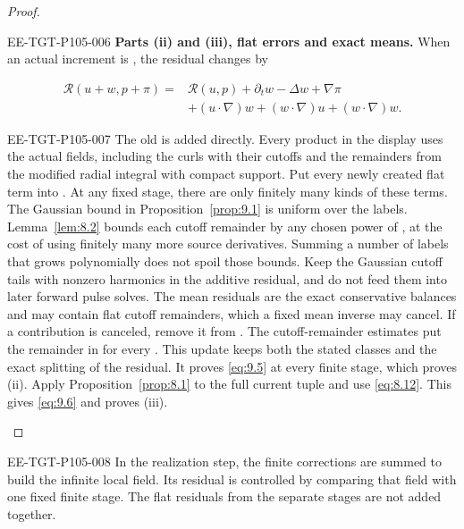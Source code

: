 \begin{proof}
\begin{EESegment}{EE-TGT-P105-006}
\noindent\textbf{Parts (ii) and (iii), flat errors and exact means.} When an actual increment is
, the residual changes by
\end{EESegment}
\[
\begin{aligned}
\mathscr R(u+w,p+\pi)={}&\mathscr R(u,p)+\partial_t w-\Delta w+\nabla\pi\\
&+(u\mathbin{\cdot}\nabla)w+(w\mathbin{\cdot}\nabla)u+(w\mathbin{\cdot}\nabla)w.
\end{aligned}
\]
\begin{EESegment}{EE-TGT-P105-007}
The old  is added directly. Every product in the display uses the
actual fields, including the curls with their cutoffs and the remainders from the modified radial
integral with compact support. Put every newly created flat term into
. At any fixed stage, there are only finitely many kinds of these
terms. The Gaussian bound in Proposition~\ref{prop:9.1} is uniform over the labels.
Lemma~\ref{lem:8.2} bounds each cutoff remainder by any chosen power of
, at the cost of using finitely many more source derivatives. Summing a
number of labels that grows polynomially does not spoil those bounds. Keep the Gaussian cutoff tails
with nonzero harmonics in the additive residual, and do not feed them into later forward pulse
solves. The mean residuals  are the exact conservative balances
and may contain flat cutoff remainders, which a fixed mean inverse may cancel. If a contribution
is canceled, remove it from . The cutoff-remainder estimates put the
remainder in  for every
. This update keeps both the stated classes and the exact splitting of
the residual. It proves \eqref{eq:9.5} at every finite stage, which proves (ii). Apply
Proposition~\ref{prop:8.1} to the full current tuple and use \eqref{eq:8.12}. This gives
\eqref{eq:9.6} and proves (iii).
\end{EESegment}
\end{proof}

\begin{EESegment}{EE-TGT-P105-008}
In the realization step, the finite corrections are summed to build the infinite local field. Its
residual is controlled by comparing that field with one fixed finite stage. The flat residuals
from the separate stages are not added together.
\end{EESegment}

